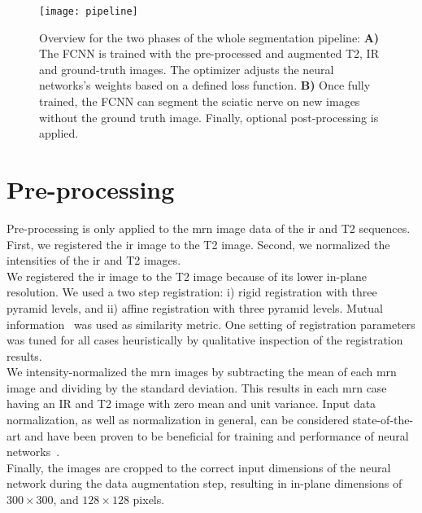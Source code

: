 \begin{figure}[htbp]
	\caption[Segmentation Pipeline]{Overview for the two phases of the whole segmentation pipeline: \textbf{A)} The FCNN is trained with the pre-processed and augmented T2, IR and ground-truth images. The optimizer adjusts the neural networks's weights based on a defined loss function. \textbf{B)} Once fully trained, the FCNN can segment the sciatic nerve on new images without the ground truth image. Finally, optional post-processing is applied.}
	\label{fig:pipeline}
	\texttt{[image: pipeline]}    
\end{figure}

\section{Pre-processing} \label{sec:preprocessing}
Pre-processing is only applied to the \gls{mrn} image data of the \gls{ir} and T2 sequences. First, we registered the \gls{ir} image to the T2 image. Second, we normalized the intensities of the \gls{ir} and T2 images.\\
We registered the \gls{ir} image to the T2 image because of its lower in-plane resolution. We used a two step registration: i) rigid registration with three pyramid levels, and ii) affine registration with three pyramid levels. Mutual information~\cite{Maes1997MultimodalityInformation} was used as similarity metric. One setting of registration parameters was tuned for all cases heuristically by qualitative inspection of the registration results.\\
We intensity-normalized the \gls{mrn} images by subtracting the mean of each \gls{mrn} image and dividing by the standard deviation. This results in each \gls{mrn} case having an IR and T2 image with zero mean and unit variance. Input data normalization, as well as normalization in general, can be considered state-of-the-art and have been proven to be beneficial for training and performance of neural networks~\cite{Sola1997ImportanceProblems,SergeyIoffe2015BatchNormalization}.\\
Finally, the images are cropped to the correct input dimensions of the neural network during the data augmentation step, resulting in in-plane dimensions of $300 \times 300$, and $128 \times 128$ pixels.

